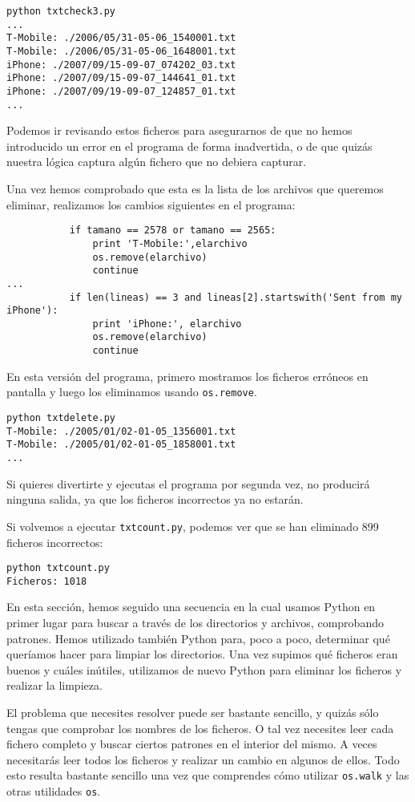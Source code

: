 \beforeverb
\begin{verbatim}
python txtcheck3.py
...
T-Mobile: ./2006/05/31-05-06_1540001.txt
T-Mobile: ./2006/05/31-05-06_1648001.txt
iPhone: ./2007/09/15-09-07_074202_03.txt
iPhone: ./2007/09/15-09-07_144641_01.txt
iPhone: ./2007/09/19-09-07_124857_01.txt
...
\end{verbatim}
\afterverb
%
Podemos ir revisando estos ficheros para asegurarnos de que no hemos
introducido un error en el programa de forma inadvertida, o de que quizás
nuestra lógica captura algún fichero que no debiera capturar.

Una vez hemos comprobado que esta es la lista de los archivos que queremos eliminar,
realizamos los cambios siguientes en el programa:

\beforeverb
\begin{verbatim}
           if tamano == 2578 or tamano == 2565:
               print 'T-Mobile:',elarchivo
               os.remove(elarchivo)
               continue
...
           if len(lineas) == 3 and lineas[2].startswith('Sent from my iPhone'):
               print 'iPhone:', elarchivo
               os.remove(elarchivo)
               continue
\end{verbatim}
\afterverb
%
En esta versión del programa, primero mostramos los ficheros erróneos
en pantalla y luego los eliminamos
usando {\tt os.remove}.

\beforeverb
\begin{verbatim}
python txtdelete.py 
T-Mobile: ./2005/01/02-01-05_1356001.txt
T-Mobile: ./2005/01/02-01-05_1858001.txt
...
\end{verbatim}
\afterverb
%
Si quieres divertirte y ejecutas el programa por segunda vez, no producirá ninguna salida,
ya que los ficheros incorrectos ya no estarán.

Si volvemos a ejecutar {\tt txtcount.py}, podemos ver que se han eliminado
899 ficheros incorrectos:
\beforeverb
\begin{verbatim}
python txtcount.py 
Ficheros: 1018
\end{verbatim}
\afterverb
%
En esta sección, hemos seguido una secuencia en la cual usamos
Python en primer lugar para buscar a través de los directorios y archivos, comprobando
patrones. Hemos utilizado también Python para, poco a poco, determinar qué queríamos
hacer para limpiar los directorios. Una vez supimos
qué ficheros eran buenos y cuáles inútiles, utilizamos de nuevo Python
para eliminar los ficheros y realizar la limpieza.

El problema que necesites resolver puede ser bastante sencillo,
y quizás sólo tengas que comprobar los nombres de los ficheros.
O tal vez necesites leer cada fichero completo y buscar ciertos patrones en el
interior del mismo. A veces necesitarás
leer todos los ficheros y realizar un cambio en
algunos de ellos. Todo esto resulta bastante
sencillo una vez que comprendes cómo utilizar {\tt os.walk}
y las otras utilidades {\tt os}.

